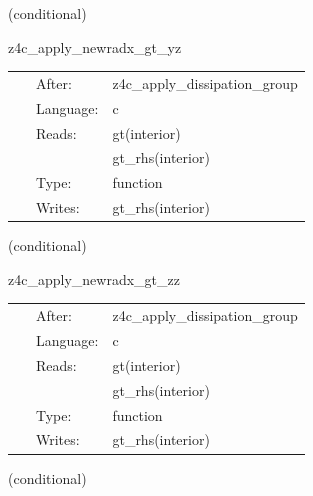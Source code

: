 \vspace{5mm}

   (conditional) 

\hspace{5mm} z4c\_apply\_newradx\_gt\_yz 



\hspace{5mm}

 \begin{tabular*}{160mm}{cll} 
~ & After:  & z4c\_apply\_dissipation\_group \\ 
~ & Language:  & c \\ 
~ & Reads:  & gt(interior) \\ 
~& ~ &gt\_rhs(interior)\\ 
~ & Type:  & function \\ 
~ & Writes:  & gt\_rhs(interior) \\ 
\end{tabular*} 


\vspace{5mm}

   (conditional) 

\hspace{5mm} z4c\_apply\_newradx\_gt\_zz 



\hspace{5mm}

 \begin{tabular*}{160mm}{cll} 
~ & After:  & z4c\_apply\_dissipation\_group \\ 
~ & Language:  & c \\ 
~ & Reads:  & gt(interior) \\ 
~& ~ &gt\_rhs(interior)\\ 
~ & Type:  & function \\ 
~ & Writes:  & gt\_rhs(interior) \\ 
\end{tabular*} 


\vspace{5mm}

   (conditional) 

